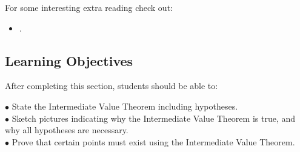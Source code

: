 \documentclass{ximera}
\begin{document}
%
%

For some interesting extra reading check out:
\begin{itemize}
\item {}.
\end{itemize}

\subsection{Learning Objectives}
After completing this section, students should be able to:
\vspace{.05in}

\noindent$\bullet$ State the Intermediate Value Theorem including hypotheses.
\\$\bullet$ Sketch pictures indicating why the Intermediate Value Theorem is true, and why all hypotheses are necessary.
\\$\bullet$ Prove that certain points must exist using the Intermediate Value Theorem.
%
\end{document}
